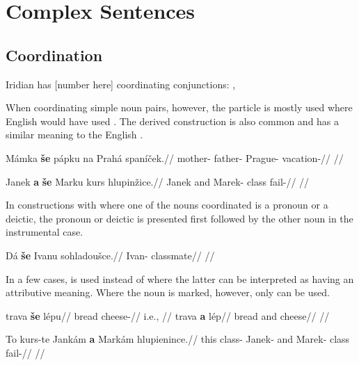 \chapter{Complex Sentences}

\section{Coordination} 

Iridian has [number here] coordinating conjunctions: ,

When coordinating simple noun pairs, however, the particle  is mostly used where English would have used . The derived construction  is also common and has a similar meaning to the English .

\pex
\begingl
    \gla M\'amka \textbf{\v{s}e} p\'apku na Prah\'a span\'i\v{c}ek.//
    \glb mother-  father-  Prague- vacation-//
    \glft {}//
\endgl
\xe

\pex
\begingl
    \gla Janek \textbf{a} \textbf{\v{s}e} Marku kurs hlupin\v{z}ice.//
    \glb Janek and  Marek- class fail-//
    \glft {}//
\endgl
\xe

In constructions with  where one of the nouns coordinated is a pronoun or a deictic, the pronoun or deictic is presented first followed by the other noun in the instrumental case.

\pex
\begingl
    \gla D\'a \textbf{\v{s}e} Ivanu sohladou\v{s}ce.//
    \glb {}  Ivan- classmate//
    \glft {}//
\endgl
\xe

In a few cases,  is used instead of  where the latter can be interpreted as having an attributive meaning. Where the noun is marked, however, only  can be used.

\pex
\a
\begingl
    \gla trava \textbf{\v{s}e} l\'epu//
    \glb bread  cheese-//
    \glft {} i.e., //
\endgl
\a
\begingl
    \gla trava \textbf{a} l\'ep//
    \glb bread and cheese//
    \glft {}//
\endgl
\xe

\pex
\begingl
    \gla To kurs-te Jank\'am \textbf{a} Mark\'am hlupienince.//
    \glb this class- Janek- and Marek- class fail-//
    \glft {}//
\endgl
\xe


